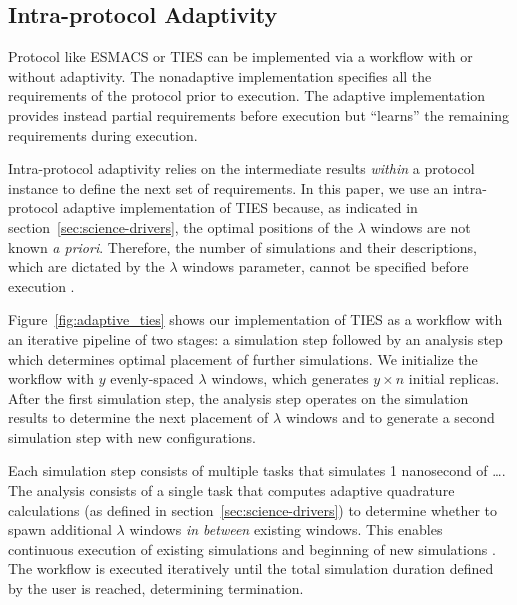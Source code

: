 \subsection{Intra-protocol Adaptivity} 



Protocol like ESMACS or TIES can be implemented via a workflow with or
without adaptivity. The nonadaptive implementation specifies all the
requirements of the protocol prior to execution. The adaptive implementation
provides instead partial requirements before execution but ``learns'' the
remaining requirements during execution.

Intra-protocol adaptivity relies on the intermediate results \textit{within}
a protocol instance to define the next set of requirements. In this paper, we
use an intra-protocol adaptive implementation of TIES because, as indicated
in section~\ref{sec:science-drivers}, the optimal positions of the $\lambda$
windows are not known \textit{a priori}. Therefore, the number of simulations
and their descriptions, which are dictated by the $\lambda$ windows
parameter, cannot be specified before execution .

Figure~\ref{fig:adaptive_ties} shows our implementation of TIES as a workflow
with an iterative pipeline of two stages: a simulation step followed by an
analysis step which determines optimal placement  of further
simulations. We initialize the workflow with $y$ evenly-spaced $\lambda$
windows, which generates $y \times n$ initial replicas. After the first
simulation step, the analysis step operates on the simulation results to
determine the next placement of $\lambda$ windows and to generate a second
simulation step with new configurations. 

Each simulation step consists of multiple tasks that simulates 1 nanosecond
of \ldots {}. The analysis
consists of a single task that computes adaptive quadrature calculations (as
defined in section~\ref{sec:science-drivers}) to determine whether to spawn
additional $\lambda$ windows \textit{in between} existing windows. This
enables continuous execution of existing simulations and beginning of new
simulations .
The workflow is executed iteratively until the total simulation duration
defined by the user is reached, determining termination.

